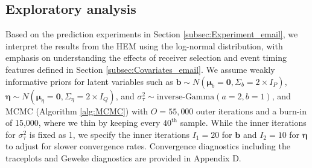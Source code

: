 \documentclass[ba]{imsart}
\numberwithin{equation}{section}
\theoremstyle{plain}
\begin{document}
	\subsection{Exploratory analysis}\label{subsec:Result_email}
	Based on the prediction experiments in Section \ref{subsec:Experiment_email}, we interpret the results from the HEM using the log-normal distribution, with emphasis on understanding the effects of receiver selection and event timing features defined in Section \ref{subsec:Covariates_email}. We assume weakly informative priors for latent variables such as $\boldsymbol{b}\sim N(\boldsymbol{\mu}_b=\boldsymbol{0}, \Sigma_b = 2\times I_P)$, $\boldsymbol{\eta}\sim N(\boldsymbol{\mu}_\eta=\boldsymbol{0}, \Sigma_\eta = 2\times I_Q)$, and $\sigma_\tau^2 \sim \mbox{inverse-Gamma}(a=2, b=1)$, and MCMC (Algorithm \ref{alg:MCMC}) with $O=55,000$ outer iterations and a burn-in of 15,000, where we thin by keeping every $40^{\textrm{th}}$ sample. While the inner iterations for $\sigma_\tau^2$ is fixed as 1, we specify the inner iterations $I_1=20$ for $\boldsymbol{b}$ and $I_2=10$ for $\boldsymbol{\eta}$ to adjust for slower convergence rates. Convergence diagnostics including the traceplots and Geweke diagnostics \citep{geweke1991evaluating} are provided in Appendix D.
	
\end{document}
